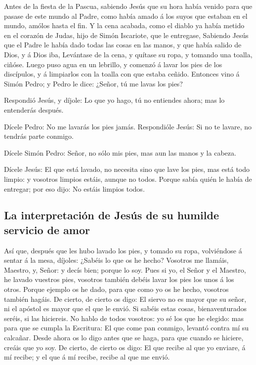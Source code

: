  Antes de la fiesta de la Pascua, sabiendo Jesús que su
hora había venido para que pasase de este mundo al Padre, como había
amado á los suyos que estaban en el mundo, amólos hasta el fin.
 Y la cena acabada, como el diablo ya había metido en el
corazón de Judas, hijo de Simón Iscariote, que le entregase,
 Sabiendo Jesús que el Padre le había dado todas las cosas
en las manos, y que había salido de Dios, y á Dios iba, 
Levántase de la cena, y quítase su ropa, y tomando una toalla, ciñóse.
 Luego puso agua en un lebrillo, y comenzó á lavar los
pies de los discípulos, y á limpiarlos con la toalla con que estaba
ceñido.  Entonces vino á Simón Pedro; y Pedro le dice:
¿Señor, tú me lavas los pies?

 Respondió Jesús, y díjole: Lo que yo hago, tú no
entiendes ahora; mas lo entenderás después.

 Dícele Pedro: No me lavarás los pies jamás. Respondióle
Jesús: Si no te lavare, no tendrás parte conmigo.

 Dícele Simón Pedro: Señor, no sólo mis pies, mas aun las
manos y la cabeza.

 Dícele Jesús: El que está lavado, no necesita sino que
lave los pies, mas está todo limpio: y vosotros limpios estáis, aunque
no todos.  Porque sabía quién le había de entregar; por
eso dijo: No estáis limpios todos.

\hypertarget{la-interpretaciuxf3n-de-jesuxfas-de-su-humilde-servicio-de-amor}{%
\subsection{La interpretación de Jesús de su humilde servicio de
amor}\label{la-interpretaciuxf3n-de-jesuxfas-de-su-humilde-servicio-de-amor}}

 Así que, después que les hubo lavado los pies, y tomado
su ropa, volviéndose á sentar á la mesa, díjoles: ¿Sabéis lo que os he
hecho?  Vosotros me llamáis, Maestro, y, Señor: y decís
bien; porque lo soy.  Pues si yo, el Señor y el Maestro,
he lavado vuestros pies, vosotros también debéis lavar los pies los unos
á los otros.  Porque ejemplo os he dado, para que como yo
os he hecho, vosotros también hagáis.  De cierto, de
cierto os digo: El siervo no es mayor que su señor, ni el apóstol es
mayor que el que le envió.  Si sabéis estas cosas,
bienaventurados seréis, si las hiciereis.  No hablo de
todos vosotros: yo sé los que he elegido: mas para que se cumpla la
Escritura: El que come pan conmigo, levantó contra mí su calcañar.
 Desde ahora os lo digo antes que se haga, para que
cuando se hiciere, creáis que yo soy.  De cierto, de
cierto os digo: El que recibe al que yo enviare, á mí recibe; y el que á
mí recibe, recibe al que me envió.


